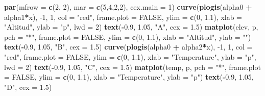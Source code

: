 \documentclass[
]{book}
\newenvironment{Shaded}{\begin{snugshade}}{\end{snugshade}}
\newcommand{\DataTypeTok}[1]{\textcolor[rgb]{0.13,0.29,0.53}{#1}}
\newcommand{\DecValTok}[1]{\textcolor[rgb]{0.00,0.00,0.81}{#1}}
\newcommand{\FloatTok}[1]{\textcolor[rgb]{0.00,0.00,0.81}{#1}}
\newcommand{\KeywordTok}[1]{\textcolor[rgb]{0.13,0.29,0.53}{\textbf{#1}}}
\newcommand{\NormalTok}[1]{#1}
\newcommand{\OperatorTok}[1]{\textcolor[rgb]{0.81,0.36,0.00}{\textbf{#1}}}
\newcommand{\OtherTok}[1]{\textcolor[rgb]{0.56,0.35,0.01}{#1}}
\newcommand{\StringTok}[1]{\textcolor[rgb]{0.31,0.60,0.02}{#1}}
\begin{document}
\begin{Shaded}
\begin{Highlighting}[]
\KeywordTok{par}\NormalTok{(}\DataTypeTok{mfrow =} \KeywordTok{c}\NormalTok{(}\DecValTok{2}\NormalTok{, }\DecValTok{2}\NormalTok{), }\DataTypeTok{mar =} \KeywordTok{c}\NormalTok{(}\DecValTok{5}\NormalTok{,}\DecValTok{4}\NormalTok{,}\DecValTok{2}\NormalTok{,}\DecValTok{2}\NormalTok{), }\DataTypeTok{cex.main =} \DecValTok{1}\NormalTok{)}
\KeywordTok{curve}\NormalTok{(}\KeywordTok{plogis}\NormalTok{(alpha0 }\OperatorTok{+}\StringTok{ }\NormalTok{alpha1}\OperatorTok{*}\NormalTok{x), }\DecValTok{-1}\NormalTok{, }\DecValTok{1}\NormalTok{, }\DataTypeTok{col =} \StringTok{"red"}\NormalTok{, }\DataTypeTok{frame.plot =} \OtherTok{FALSE}\NormalTok{, }\DataTypeTok{ylim =} \KeywordTok{c}\NormalTok{(}\DecValTok{0}\NormalTok{, }\FloatTok{1.1}\NormalTok{), }
      \DataTypeTok{xlab =} \StringTok{"Altitud"}\NormalTok{, }\DataTypeTok{ylab =} \StringTok{"p"}\NormalTok{, }\DataTypeTok{lwd =} \DecValTok{2}\NormalTok{)}
\KeywordTok{text}\NormalTok{(}\OperatorTok{-}\FloatTok{0.9}\NormalTok{, }\FloatTok{1.05}\NormalTok{, }\StringTok{"A"}\NormalTok{, }\DataTypeTok{cex =} \FloatTok{1.5}\NormalTok{)}
\KeywordTok{matplot}\NormalTok{(elev, p, }\DataTypeTok{pch =} \StringTok{"*"}\NormalTok{, }\DataTypeTok{frame.plot =} \OtherTok{FALSE}\NormalTok{, }\DataTypeTok{ylim =} \KeywordTok{c}\NormalTok{(}\DecValTok{0}\NormalTok{, }\FloatTok{1.1}\NormalTok{), }\DataTypeTok{xlab =} \StringTok{"Altitud"}\NormalTok{, }
        \DataTypeTok{ylab =} \StringTok{""}\NormalTok{)}
\KeywordTok{text}\NormalTok{(}\OperatorTok{-}\FloatTok{0.9}\NormalTok{, }\FloatTok{1.05}\NormalTok{, }\StringTok{"B"}\NormalTok{, }\DataTypeTok{cex =} \FloatTok{1.5}\NormalTok{)}
\KeywordTok{curve}\NormalTok{(}\KeywordTok{plogis}\NormalTok{(alpha0 }\OperatorTok{+}\StringTok{ }\NormalTok{alpha2}\OperatorTok{*}\NormalTok{x), }\DecValTok{-1}\NormalTok{, }\DecValTok{1}\NormalTok{, }\DataTypeTok{col =} \StringTok{"red"}\NormalTok{, }\DataTypeTok{frame.plot =} \OtherTok{FALSE}\NormalTok{, }\DataTypeTok{ylim =} \KeywordTok{c}\NormalTok{(}\DecValTok{0}\NormalTok{, }\FloatTok{1.1}\NormalTok{), }
      \DataTypeTok{xlab =} \StringTok{"Temperature"}\NormalTok{, }\DataTypeTok{ylab =} \StringTok{"p"}\NormalTok{, }\DataTypeTok{lwd =} \DecValTok{2}\NormalTok{)}
\KeywordTok{text}\NormalTok{(}\OperatorTok{-}\FloatTok{0.9}\NormalTok{, }\FloatTok{1.05}\NormalTok{, }\StringTok{"C"}\NormalTok{, }\DataTypeTok{cex =} \FloatTok{1.5}\NormalTok{)}
\KeywordTok{matplot}\NormalTok{(temp, p, }\DataTypeTok{pch =} \StringTok{"*"}\NormalTok{, }\DataTypeTok{frame.plot =} \OtherTok{FALSE}\NormalTok{, }\DataTypeTok{ylim =} \KeywordTok{c}\NormalTok{(}\DecValTok{0}\NormalTok{, }\FloatTok{1.1}\NormalTok{), }\DataTypeTok{xlab =} \StringTok{"Temperature"}\NormalTok{, }
        \DataTypeTok{ylab =} \StringTok{"p"}\NormalTok{)}
\KeywordTok{text}\NormalTok{(}\OperatorTok{-}\FloatTok{0.9}\NormalTok{, }\FloatTok{1.05}\NormalTok{, }\StringTok{"D"}\NormalTok{, }\DataTypeTok{cex =} \FloatTok{1.5}\NormalTok{)}
\end{Highlighting}
\end{Shaded}
\end{document}
